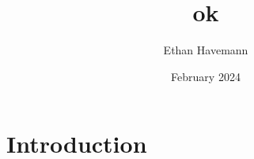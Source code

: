 \documentclass{article}
\title{ok}
\author{Ethan Havemann}
\date{February 2024}
\begin{document}
\maketitle

\section{Introduction}
\end{document}
